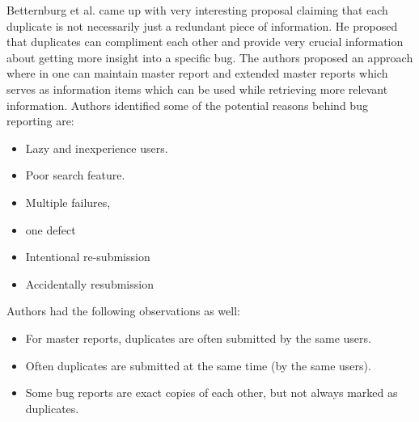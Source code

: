 \documentclass[]{sig-alternate-05-2015}
\begin{document}
Betternburg et al. came up with very interesting proposal claiming that each duplicate is not necessarily just a redundant piece of information. He proposed that duplicates can compliment each other and provide very crucial information about getting more insight into a specific bug. The authors proposed an approach where in one can maintain master report and extended master reports which serves as information items which can be used while retrieving more relevant information. Authors identified some of the potential reasons behind bug reporting are:
\begin{itemize}
\item Lazy and inexperience users.
\item Poor search feature.
\item Multiple failures,
\item one defect
\item Intentional re-submission
\item Accidentally resubmission
\end{itemize}
Authors had the following observations as well:
\begin{itemize}
\item  For master reports, duplicates are often submitted
by the same users.
\item  Often duplicates are submitted at the same time (by
the same users).
\item  Some bug reports are exact copies of each other,
but not always marked as duplicates.
\end{itemize}
\end{document}
